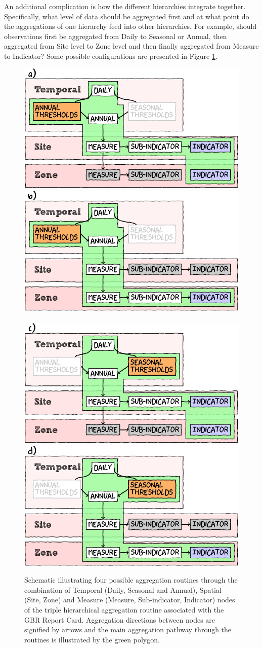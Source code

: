 An additional complication is how the different hierarchies integrate together.  Specifically, what
level of data should be aggregated first and at what point do the aggregations of one hierarchy feed
into other hierarchies. For example, should observations first be aggregated from Daily to Seasonal
or Annual, then aggregated from Site level to Zone level and then finally aggregated from Measure to
Indicator?  Some possible configurations are presented in Figure \ref{fig:hier}.


\begin{landscape}
\begin{figure}[h]
\includegraphics[width=0.49\linewidth]{figures/Diagrams/hier.pdf}
\includegraphics[width=0.49\linewidth]{figures/Diagrams/hier1.pdf}\\\\[1em]
\includegraphics[width=0.49\linewidth]{figures/Diagrams/hier2.pdf}
\includegraphics[width=0.49\linewidth]{figures/Diagrams/hier3.pdf}
\caption{Schematic illustrating four possible aggregation routines through the combination of Temporal (Daily, Seasonal and Annual), Spatial (Site, Zone) and Measure 
(Measure, Sub-indicator, Indicator) nodes of the triple hierarchical
aggregation routine associated with the GBR Report Card. Aggregation directions between 
nodes are signified by arrows and the main aggregation pathway through
the routines is illustrated by the green polygon. }\label{fig:hier}
\end{figure}
\end{landscape}
       



